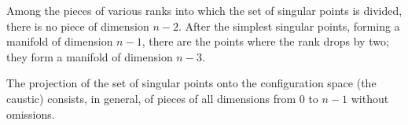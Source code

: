 Among the pieces of various ranks into which the set of singular points is divided, there is no piece of dimension $n - 2$. After the simplest singular points, forming a manifold of dimension $n - 1$, there are the points where the rank drops by two; they form a manifold of dimension $n - 3$.

The projection of the set of singular points onto the configuration space (the caustic) consists, in general, of pieces of all dimensions from $0$ to $n - 1$ without omissions.

